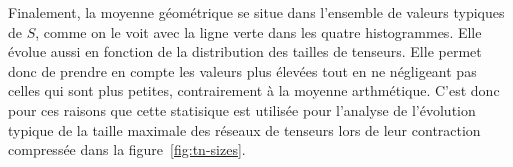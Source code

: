 Finalement, la moyenne géométrique se situe dans l'ensemble de valeurs typiques de $S$, comme on le voit avec la ligne verte dans les quatre histogrammes.
Elle évolue aussi en fonction de la distribution des tailles de tenseurs.
Elle permet donc de prendre en compte les valeurs plus élevées tout en ne négligeant pas celles qui sont plus petites, contrairement à la moyenne arthmétique.
C'est donc pour ces raisons que cette statisique est utilisée pour l'analyse de l'évolution typique de la taille maximale des réseaux de tenseurs lors de leur contraction compressée dans la figure~\ref{fig:tn-sizes}.

